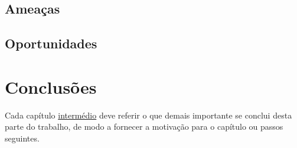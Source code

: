 \subsection{Ameaças}
\label{chap4:subsec:ameacas}

\subsection{Oportunidades}
\label{chap4:subsec:oportunidades}

\section{Conclusões}
\label{chap4:sec:concs}
Cada capítulo \underline{intermédio} deve referir o que demais importante se conclui desta parte do trabalho, de modo a fornecer a motivação para o capítulo ou passos seguintes.